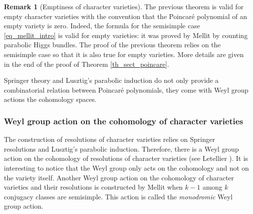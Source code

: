 \documentclass[JEP,XML,SOM,NoEqCountersInSection,Unicode,published]{cedram}
\theoremstyle{definition}
\newtheorem{remark}[definition]{Remark}
\theoremstyle{plain}
\begin{document}
\begin{remark}[Emptiness of character varieties]
The previous theorem is valid for empty character varieties with the convention that the Poincaré polynomial of an empty variety is zero. Indeed, the formula for the semisimple case \eqref{eq_mellit_intro} is valid for empty varieties: it was proved by Mellit by counting parabolic Higgs bundles. The proof of the previous theorem relies on the semisimple case so that it is also true for empty varieties. More details are given in the end of the proof of Theorem \ref{th_sect_poincare}.
\end{remark}

Springer theory and Lusztig's parabolic induction do not only provide a combinatorial relation between Poincaré polynomials, they come with Weyl group actions the cohomology spaces.

\subsubsection{Weyl group action on the cohomology of character varieties}
The construction of resolutions of character varieties relies on Springer resolutions and Lusztig's parabolic induction. Therefore, there is a Weyl group action on the cohomology of resolutions of character varieties (see Letellier \cite{Letellier13}). It is interesting to notice that the Weyl group only acts on the cohomology and not on the variety itself. Another Weyl group action on the cohomology of character varieties and their resolutions is constructed by Mellit \cite{Mellit2019} when $k-1$ among $k$ conjugacy classes are semisimple. This action is called the \textit{monodromic} Weyl group action.
\end{document}
